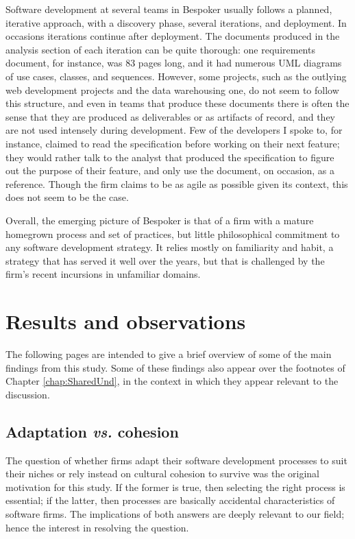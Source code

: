 Software development at several teams in Bespoker usually follows a planned, iterative approach, with a discovery phase, several iterations, and deployment. In occasions iterations continue after deployment. The documents produced in the analysis section of each iteration can be quite thorough: one requirements document, for instance, was 83 pages long, and it had numerous UML diagrams of use cases, classes, and sequences. However, some projects, such as the outlying web development projects and the data warehousing one, do not seem to follow this structure, and even in teams that produce these documents there is often the sense that they are produced as deliverables or as artifacts of record, and they are not used intensely during development. Few of the developers I spoke to, for instance, claimed to read the specification before working on their next feature; they would rather talk to the analyst that produced the specification to figure out the purpose of their feature, and only use the document, on occasion, as a reference. Though the firm claims to be as agile as possible given its context, this does not seem to be the case.

Overall, the emerging picture of Bespoker is that of a firm with a mature homegrown process and set of practices, but little philosophical commitment to any software development strategy. It relies mostly on familiarity and habit, a strategy that has served it well over the years, but that is challenged by the firm's recent incursions in unfamiliar domains.


\section{Results and observations}

The following pages are intended to give a brief overview of some of the main findings from this study. Some of these findings also appear over the footnotes of Chapter \ref{chap:SharedUnd}, in the context in which they appear relevant to the discussion.

\subsection{Adaptation \emph{vs.} cohesion}
\label{sec:AdaptationVsCohesion}

The question of whether firms adapt their software development processes to suit their niches or rely instead on cultural cohesion to survive was the original motivation for this study. If the former is true, then selecting the right process is essential; if the latter, then processes are basically accidental characteristics of software firms. The implications of both answers are deeply relevant to our field; hence the interest in resolving the question.

